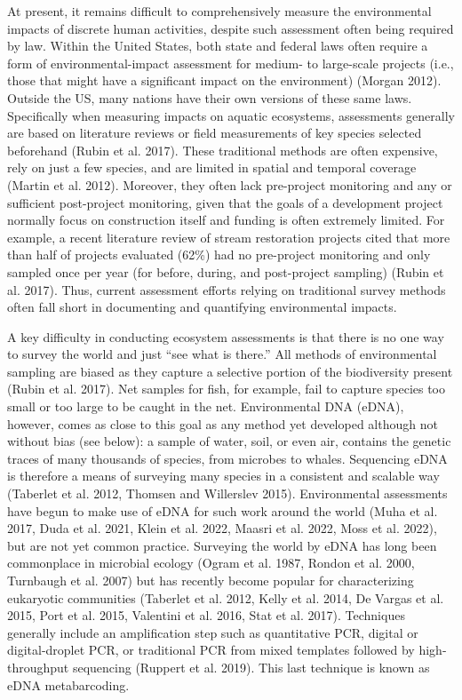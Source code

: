 \documentclass[
]{article}
\begin{document}
At present, it remains difficult to comprehensively measure the
environmental impacts of discrete human activities, despite such
assessment often being required by law. Within the United States, both
state and federal laws often require a form of environmental-impact
assessment for medium- to large-scale projects (i.e., those that might
have a significant impact on the environment) (Morgan 2012). Outside the
US, many nations have their own versions of these same laws.
Specifically when measuring impacts on aquatic ecosystems, assessments
generally are based on literature reviews or field measurements of key
species selected beforehand (Rubin et al. 2017). These traditional
methods are often expensive, rely on just a few species, and are limited
in spatial and temporal coverage (Martin et al. 2012). Moreover, they
often lack pre-project monitoring and any or sufficient post-project
monitoring, given that the goals of a development project normally focus
on construction itself and funding is often extremely limited. For
example, a recent literature review of stream restoration projects cited
that more than half of projects evaluated (62\%) had no pre-project
monitoring and only sampled once per year (for before, during, and
post-project sampling) (Rubin et al. 2017). Thus, current assessment
efforts relying on traditional survey methods often fall short in
documenting and quantifying environmental impacts.

A key difficulty in conducting ecosystem assessments is that there is no
one way to survey the world and just ``see what is there.'' All methods
of environmental sampling are biased as they capture a selective portion
of the biodiversity present (Rubin et al. 2017). Net samples for fish,
for example, fail to capture species too small or too large to be caught
in the net. Environmental DNA (eDNA), however, comes as close to this
goal as any method yet developed although not without bias (see below):
a sample of water, soil, or even air, contains the genetic traces of
many thousands of species, from microbes to whales. Sequencing eDNA is
therefore a means of surveying many species in a consistent and scalable
way (Taberlet et al. 2012, Thomsen and Willerslev 2015). Environmental
assessments have begun to make use of eDNA for such work around the
world (Muha et al. 2017, Duda et al. 2021, Klein et al. 2022, Maasri et
al. 2022, Moss et al. 2022), but are not yet common practice. Surveying
the world by eDNA has long been commonplace in microbial ecology (Ogram
et al. 1987, Rondon et al. 2000, Turnbaugh et al. 2007) but has recently
become popular for characterizing eukaryotic communities (Taberlet et
al. 2012, Kelly et al. 2014, De Vargas et al. 2015, Port et al. 2015,
Valentini et al. 2016, Stat et al. 2017). Techniques generally include
an amplification step such as quantitative PCR, digital or
digital-droplet PCR, or traditional PCR from mixed templates followed by
high-throughput sequencing (Ruppert et al. 2019). This last technique is
known as eDNA metabarcoding.
\end{document}

